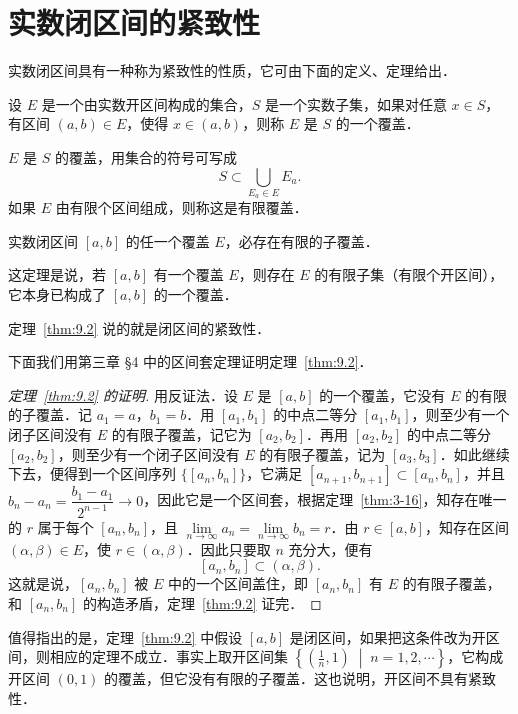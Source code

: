 \section{实数闭区间的紧致性}

实数闭区间具有一种称为紧致性的性质，它可由下面的定义、定理给出．

\begin{definition}\label{def:9.2}
设 $E$ 是一个由实数开区间构成的集合，$S$ 是一个实数子集，如果对任意 $x \in S$，有区间 $(a, b) \in E$，使得 $x \in (a, b)$，则称 $E$ 是 $S$ 的一个覆盖．
\end{definition}

$E$ 是 $S$ 的覆盖，用集合的符号可写成
\[
S \subset \bigcup_{E_a \in E} E_a.
\]
如果 $E$ 由有限个区间组成，则称这是有限覆盖．

\begin{theorem}\label{thm:9.2}
实数闭区间 $[a, b]$ 的任一个覆盖 $E$，必存在有限的子覆盖．
\end{theorem}

这定理是说，若 $[a, b]$ 有一个覆盖 $E$，则存在 $E$ 的有限子集（有限个开区间），它本身已构成了 $[a, b]$ 的一个覆盖．

定理~\ref{thm:9.2} 说的就是闭区间的紧致性．

下面我们用第三章 §4 中的区间套定理证明定理~\ref{thm:9.2}．

\begin{proof}[定理~\ref{thm:9.2} 的证明]
用反证法．设 $E$ 是 $[a, b]$ 的一个覆盖，它没有 $E$ 的有限的子覆盖．记 $a_1 = a$，$b_1 = b$．用 $[a_1, b_1]$ 的中点二等分 $[a_1, b_1]$，则至少有一个闭子区间没有 $E$ 的有限子覆盖，记它为 $[a_2, b_2]$．再用 $[a_2, b_2]$ 的中点二等分 $[a_2, b_2]$，则至少有一个闭子区间没有 $E$ 的有限子覆盖，记为 $[a_3, b_3]$．如此继续下去，便得到一个区间序列 $\{[a_n, b_n]\}$，它满足 $[a_{n+1}, b_{n+1}] \subset [a_n, b_n]$，并且 $b_n - a_n = \dfrac{b_1 - a_1}{2^{n-1}} \to 0$，因此它是一个区间套，根据定理~\ref{thm:3-16}，知存在唯一的 $r$ 属于每个 $[a_n, b_n]$，且 $\lim\limits_{n \to \infty} a_n = \lim\limits_{n \to \infty} b_n = r$．由 $r \in [a, b]$，知存在区间 $(\alpha, \beta) \in E$，使 $r \in (\alpha, \beta)$．因此只要取 $n$ 充分大，便有
\[
[a_n, b_n] \subset (\alpha, \beta).
\]
这就是说，$[a_n, b_n]$ 被 $E$ 中的一个区间盖住，即 $[a_n, b_n]$ 有 $E$ 的有限子覆盖，和 $[a_n, b_n]$ 的构造矛盾，定理~\ref{thm:9.2} 证完．
\end{proof}

值得指出的是，定理~\ref{thm:9.2} 中假设 $[a, b]$ 是闭区间，如果把这条件改为开区间，则相应的定理不成立．事实上取开区间集 $\left\{ \left( \frac{1}{n}, 1 \right) \;\middle|\; n = 1, 2, \cdots \right\}$，它构成开区间 $(0, 1)$ 的覆盖，但它没有有限的子覆盖．这也说明，开区间不具有紧致性．

